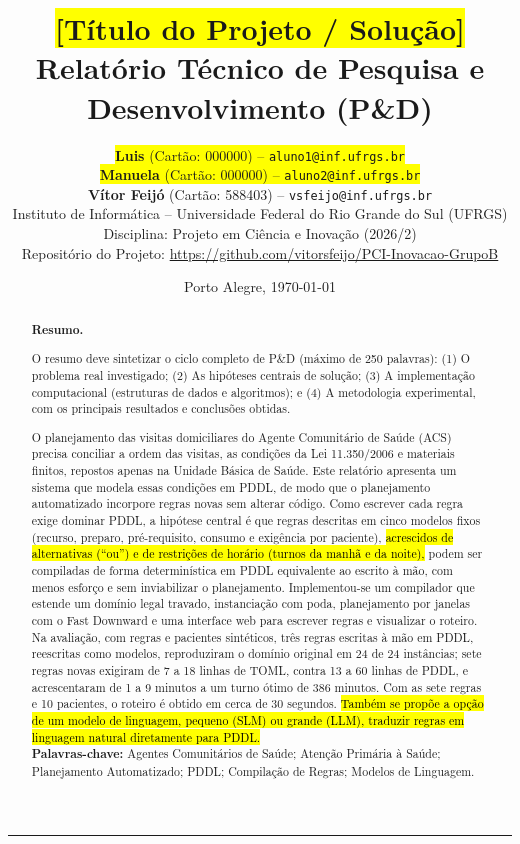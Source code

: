 \documentclass[11pt,a4paper]{article}
\title{
    \vspace{-1.0cm}
    \colorbox{yellow}{\textbf{\Large [Título do Projeto / Solução]}}\\[0.3cm] %
    \large Relatório Técnico de Pesquisa e Desenvolvimento (P\&D)
}
\author{
    \colorbox{yellow}{\textbf{Luis} (Cartão: 000000) -- \texttt{aluno1@inf.ufrgs.br}}\\ %
    \colorbox{yellow}{\textbf{Manuela} (Cartão: 000000) -- \texttt{aluno2@inf.ufrgs.br}}\\ %
    \textbf{Vítor Feijó} (Cartão: 588403) -- \texttt{vsfeijo@inf.ufrgs.br}\\[0.3cm]
    \normalsize Instituto de Informática -- Universidade Federal do Rio Grande do Sul (UFRGS)\\
    \normalsize Disciplina: Projeto em Ciência e Inovação (2026/2)\\
    \small Repositório do Projeto: \url{https://github.com/vitorsfeijo/PCI-Inovacao-GrupoB}
}
\date{Porto Alegre, \today}
\newcommand{\pendente}[1]{\hl{#1}}
\begin{document}
\maketitle
\thispagestyle{fancy}

\begin{abstract}
\noindent
\textbf{Resumo.} 
\begin{instrucao}
O resumo deve sintetizar o ciclo completo de P\&D (máximo de 250 palavras): (1) O problema real investigado; (2) As hipóteses centrais de solução; (3) A implementação computacional (estruturas de dados e algoritmos); e (4) A metodologia experimental, com os principais resultados e conclusões obtidas.
\end{instrucao}
O planejamento das visitas domiciliares do Agente Comunitário de Saúde (ACS) precisa conciliar a ordem das visitas, as condições da Lei 11.350/2006 e materiais finitos, repostos apenas na Unidade Básica de Saúde. Este relatório apresenta um sistema que modela essas condições em PDDL, de modo que o planejamento automatizado incorpore regras novas sem alterar código. Como escrever cada regra exige dominar PDDL, a hipótese central é que regras descritas em cinco modelos fixos (recurso, preparo, pré-requisito, consumo e exigência por paciente), \pendente{acrescidos de alternativas (``ou'') e de restrições de horário (turnos da manhã e da noite),} podem ser compiladas de forma determinística em PDDL equivalente ao escrito à mão, com menos esforço e sem inviabilizar o planejamento. Implementou-se um compilador que estende um domínio legal travado, instanciação com poda, planejamento por janelas com o Fast Downward e uma interface web para escrever regras e visualizar o roteiro. Na avaliação, com regras e pacientes sintéticos, três regras escritas à mão em PDDL, reescritas como modelos, reproduziram o domínio original em 24 de 24 instâncias; sete regras novas exigiram de 7 a 18 linhas de TOML, contra 13 a 60 linhas de PDDL, e acrescentaram de 1 a 9 minutos a um turno ótimo de 386 minutos. Com as sete regras e 10 pacientes, o roteiro é obtido em cerca de 30 segundos. \pendente{Também se propõe a opção de um modelo de linguagem, pequeno (SLM) ou grande (LLM), traduzir regras em linguagem natural diretamente para PDDL.}
\\[0.3cm]
\textbf{Palavras-chave:} Agentes Comunitários de Saúde; Atenção Primária à Saúde; Planejamento Automatizado; PDDL; Compilação de Regras; Modelos de Linguagem.
\end{abstract}

\vspace{0.3cm}
\hrule
\vspace{0.4cm}
\end{document}
